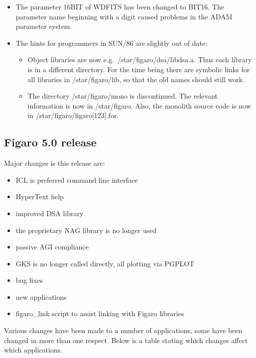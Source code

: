 \begin{itemize}
\item
   The parameter 16BIT of WDFITS has been changed to BIT16. The
   parameter name beginning with a digit caused problems in the ADAM
   parameter system.

\item
   The hints for programmers in SUN/86 are slightly out of date:

\begin{itemize}
\item
      Object libraries are now e.g.\ /star/figaro/dsa/libdsa.a. Thus each
      library is in a different directory. For the time being there are
      symbolic links for all libraries in /star/figaro/lib, so that the
      old names should still work.
\item
      The directory /star/figaro/mono is discontinued. The relevant
      information is now in /star/figaro. Also, the monolith source code
      is now in /star/figaro/figaro[123].for.

\end{itemize}

\end{itemize}


\subsection{\label{news50}Figaro 5.0 release}

   Major changes is this release are:

\begin{itemize}
\item ICL is preferred command line interface
\item HyperText help
\item improved DSA library
\item the proprietary NAG library is no longer used
\item passive AGI compliance
\item GKS is no longer called directly, all plotting via PGPLOT
\item bug fixes
\item new applications
\item figaro\_link script to assist linking with Figaro libraries
\end{itemize}

   Various changes have been made to a number of applications, some have
   been changed in more than one respect. Below is a table stating which
   changes affect which applications.

